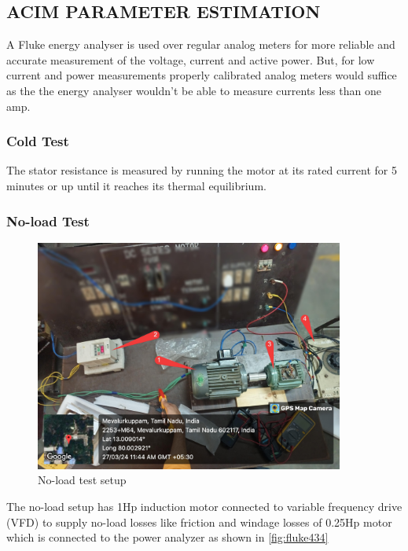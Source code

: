 \subsection{ACIM PARAMETER ESTIMATION}

A Fluke energy analyser is used over regular analog meters for more reliable and accurate measurement of the voltage, current and active power. But, for low current and power measurements properly calibrated analog meters would suffice as the the energy analyser wouldn’t be able to measure currents less than one amp.

\subsubsection{Cold Test}

The stator resistance is measured by running the motor at its rated current for 5 minutes or up until it reaches its thermal equilibrium.


\subsubsection{No-load Test}


\begin{figure}[H]
	\centering
	\includegraphics[width=4in]{sections/section5/images/ParamEstim/SetupNoload.jpg}
	\caption{No-load test setup}
	\label{fig:no_load_test_setup}
\end{figure}

The no-load setup has 1Hp induction motor connected to variable frequency drive (VFD) to supply no-load losses like friction and windage losses of 0.25Hp motor which is connected to the power analyzer as shown in \ref*{fig:fluke434}


